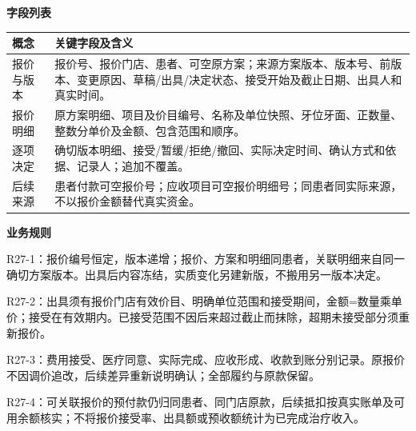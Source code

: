 \documentclass[UTF8,a4paper,zihao=-4,fontset=none]{ctexart}
\begin{document}
\noindent\textbf{字段列表}\par
{\setlength{\tabcolsep}{3pt}\renewcommand{\arraystretch}{1.04}
\noindent\begin{tabular}{@{}>{\raggedright\arraybackslash}p{2.5cm}>{\raggedright\arraybackslash}p{13.2cm}@{}}
\toprule
概念 & 关键字段及含义 \\ \midrule
报价与版本 & 报价号、报价门店、患者、可空原方案；来源方案版本、版本号、前版本、变更原因、草稿/出具/决定状态、接受开始及截止日期、出具人和真实时间。 \\
报价明细 & 原方案明细、项目及价目编号、名称及单位快照、牙位牙面、正数量、整数分单价及金额、包含范围和顺序。 \\
逐项决定 & 确切版本明细、接受/暂缓/拒绝/撤回、实际决定时间、确认方式和依据、记录人；追加不覆盖。 \\
后续来源 & 患者付款可空报价号；应收项目可空报价明细号；同患者同实际来源，不以报价金额替代真实资金。 \\
\bottomrule
\end{tabular}\par}

\smallskip\noindent\textbf{业务规则}\par
R27-1：报价编号恒定，版本递增；报价、方案和明细同患者，关联明细来自同一确切方案版本。出具后内容冻结，实质变化另建新版，不搬用另一版本决定。\par
R27-2：出具须有报价门店有效价目、明确单位范围和接受期间，金额=数量乘单价；接受在有效期内。已接受范围不因后来超过截止而抹除，超期未接受部分须重新报价。\par
R27-3：费用接受、医疗同意、实际完成、应收形成、收款到账分别记录。原报价不因调价追改，后续差异重新说明确认；全部履约与原款保留。\par
R27-4：可关联报价的预付款仍归同患者、同门店原款，后续抵扣按真实账单及可用余额核实；不将报价接受率、出具额或预收额统计为已完成治疗收入。\par
\endgroup
\clearpage
\end{document}

